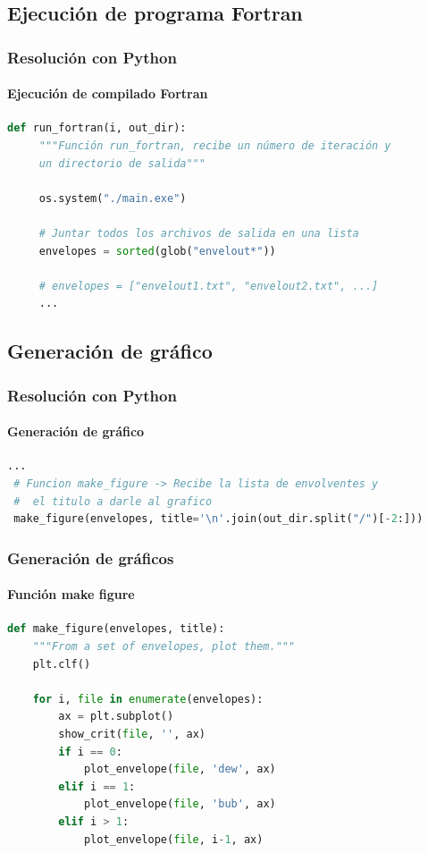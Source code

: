 \documentclass[aspectratio=1610,multi,rgb]{beamer}
\begin{document}
\subsection{Ejecución de programa Fortran}
\begin{frame}[c, fragile]
    \frametitle{Resolución con Python}
    \framesubtitle{Ejecución de compilado Fortran}


\begin{lstlisting}[language=Python]
 def run_fortran(i, out_dir):
     """Función run_fortran, recibe un número de iteración y 
     un directorio de salida"""

     os.system("./main.exe")

     # Juntar todos los archivos de salida en una lista
     envelopes = sorted(glob("envelout*"))

     # envelopes = ["envelout1.txt", "envelout2.txt", ...]
     ...
\end{lstlisting}
\end{frame}

\subsection{Generación de gráfico}
\begin{frame}[c, fragile]
    \frametitle{Resolución con Python}
    \framesubtitle{Generación de gráfico}
\begin{lstlisting}[language=python]
 ...
 # Funcion make_figure -> Recibe la lista de envolventes y 
 #  el titulo a darle al grafico
 make_figure(envelopes, title='\n'.join(out_dir.split("/")[-2:]))
\end{lstlisting}
\end{frame}

\begin{frame}[fragile]
    \frametitle{Generación de gráficos}
    \framesubtitle{Función make figure}
    


\begin{lstlisting}[language=python]
def make_figure(envelopes, title):
    """From a set of envelopes, plot them."""
    plt.clf()

    for i, file in enumerate(envelopes):
        ax = plt.subplot()
        show_crit(file, '', ax)
        if i == 0:
            plot_envelope(file, 'dew', ax)
        elif i == 1:
            plot_envelope(file, 'bub', ax)
        elif i > 1:
            plot_envelope(file, i-1, ax)
\end{lstlisting}

\end{frame}
\end{document}
